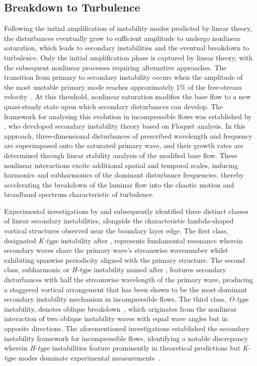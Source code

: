 \subsection{Breakdown to Turbulence}

Following the initial amplification of instability modes predicted by linear theory, the disturbances eventually grow to sufficient amplitude to undergo nonlinear saturation, which leads to secondary instabilities and the eventual breakdown to turbulence. Only the initial amplification phase is captured by linear theory, with the subsequent nonlinear processes requiring alternative approaches. The transition from primary to secondary instability occurs when the amplitude of the most unstable primary mode reaches approximately 1\% of the free-stream velocity~\citep{Klebanoff1962}. At this threshold, nonlinear saturation modifies the base flow to a new quasi-steady state upon which secondary disturbances can develop. The framework for analysing this evolution in incompressible flows was established by \citet{Herbert1988}, who developed secondary instability theory based on Floquet analysis. In this approach, three-dimensional disturbances of prescribed wavelength and frequency are superimposed onto the saturated primary wave, and their growth rates are determined through linear stability analysis of the modified base flow. These nonlinear interactions excite additional spatial and temporal scales, inducing harmonics and subharmonics of the dominant disturbance frequencies, thereby accelerating the breakdown of the laminar flow into the chaotic motion and broadband spectrum characteristic of turbulence. 

Experimental investigations by \citet{KachanovLevchenko1984} and \citet{SaricThomas1984} subsequently identified three distinct classes of linear secondary instabilities, alongside the characteristic lambda-shaped vortical structures observed near the boundary layer edge. The first class, designated \textit{K-type} instability after \citet{Klebanoff1962}, represents fundamental resonance wherein secondary waves share the primary wave's streamwise wavenumber whilst exhibiting spanwise periodicity aligned with the primary structure. The second class, subharmonic or \textit{H-type} instability named after \citet{Herbert1988}, features secondary disturbances with half the streamwise wavelength of the primary wave, producing a staggered vortical arrangement that has been shown to be the most dominant secondary instability mechanism in incompressible flows. The third class, \textit{O-type} instability, denotes oblique breakdown~\citep{Fasel1993}, which originates from the nonlinear interaction of two oblique instability waves with equal wave angles but in opposite directions. The aforementioned investigations established the secondary instability framework for incompressible flows, identifying a notable discrepancy wherein \textit{H-type} instabilities feature prominently in theoretical predictions but \textit{K-type} modes dominate experimental measurements~\citep{SpalartYang1987}.

